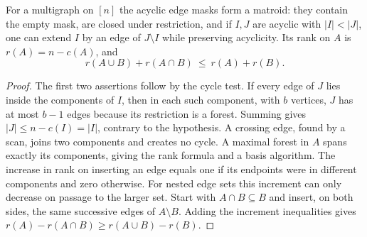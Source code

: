 \begin{theorem}\leavevmode\label{thm:matroid}
For a multigraph on $[n]$ the acyclic edge masks form a matroid: they contain
the empty mask, are closed under restriction, and if $I,J$ are acyclic with
$|I|<|J|$, one can extend $I$ by an edge of $J\setminus I$ while preserving
acyclicity. Its rank on $A$ is $r(A)=n-c(A)$, and
\[
 r(A\cup B)+r(A\cap B)\ \le\ r(A)+r(B).
\]
\end{theorem}
\begin{proof}
The first two assertions follow by the cycle test. If every edge of $J$ lies
inside the components of $I$, then in each such component, with $b$ vertices,
$J$ has at most $b-1$ edges because its restriction is a forest. Summing gives
$|J|\le n-c(I)=|I|$, contrary to the hypothesis. A crossing edge, found by
a scan, joins two components and creates no cycle. A maximal forest in $A$
spans exactly its components, giving the rank formula and a basis algorithm.
The increase in rank on inserting an edge equals one if its endpoints were
in different components and zero otherwise. For nested edge sets this
increment can only decrease on passage to the larger set. Start with
$A\cap B\subseteq B$ and insert, on both sides, the same successive edges
of $A\setminus B$. Adding the increment inequalities gives
$r(A)-r(A\cap B)\ge r(A\cup B)-r(B)$.
\end{proof}

